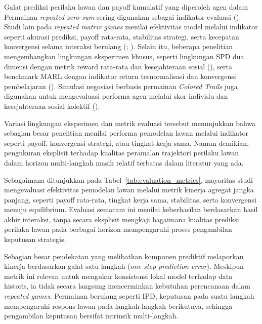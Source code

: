 Galat prediksi perilaku lawan dan payoff kumulatif yang diperoleh agen dalam Permainan \textit{repeated zero-sum} sering digunakan sebagai indikator evaluasi (\cite{li_exploiting_2025}). Studi lain pada \textit{repeated matrix games} menilai efektivitas model melalui indikator seperti akurasi prediksi, payoff rata-rata, stabilitas strategi, serta kecepatan konvergensi selama interaksi berulang (\cite{freire_modeling_2023}; \cite{hu_modeling_2023}). Selain itu, beberapa penelitian mengembangkan lingkungan eksperimen khusus, seperti lingkungan SPD dua dimensi dengan metrik reward rata-rata dan kesejahteraan sosial (\cite{wang_achieving_2019}), serta benchmark MARL dengan indikator return ternormalisasi dan konvergensi pembelajaran (\cite{jin_achieving_2025}). Simulasi negosiasi berbasis permainan \textit{Colored Trails} juga digunakan untuk mengevaluasi performa agen melalui skor individu dan kesejahteraan sosial kolektif (\cite{de_weerd_higher-order_2022}).

Variasi lingkungan eksperimen dan metrik evaluasi tersebut menunjukkan bahwa sebagian besar penelitian menilai performa pemodelan lawan melalui indikator seperti payoff, konvergensi strategi, atau tingkat kerja sama. Namun demikian, pengukuran eksplisit terhadap kualitas peramalan trajektori perilaku lawan dalam horizon multi-langkah masih relatif terbatas dalam literatur yang ada.

\noindent
Sebagaimana ditunjukkan pada Tabel~\ref{tab:evaluation_metrics}, mayoritas studi mengevaluasi efektivitas pemodelan lawan melalui metrik kinerja agregat jangka panjang, seperti payoff rata-rata, tingkat kerja sama, stabilitas, serta konvergensi menuju equilibrium. Evaluasi semacam ini menilai keberhasilan berdasarkan hasil akhir interaksi, tanpa secara eksplisit mengkaji bagaimana kualitas prediksi perilaku lawan pada berbagai horizon mempengaruhi proses pengambilan keputusan strategis.

Sebagian besar pendekatan yang melibatkan komponen prediktif melaporkan kinerja berdasarkan galat satu langkah (\textit{one-step prediction error}). Meskipun metrik ini relevan untuk mengukur konsistensi lokal model terhadap data historis, ia tidak secara langsung mencerminkan kebutuhan perencanaan dalam \textit{repeated games}. Permainan berulang seperti IPD, keputusan pada suatu langkah mempengaruhi respons lawan pada langkah-langkah berikutnya, sehingga pengambilan keputusan bersifat intrinsik multi-langkah.

